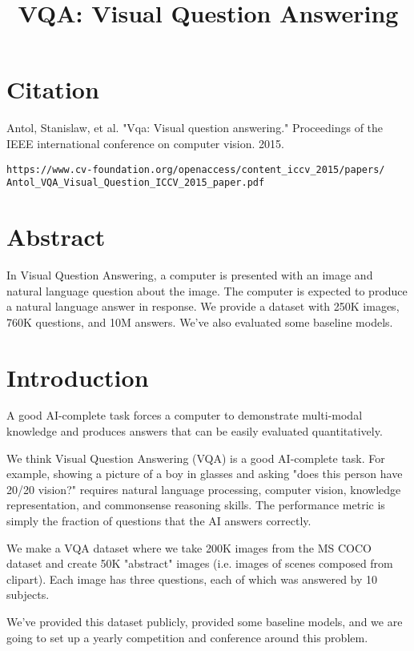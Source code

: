 \documentclass[a4paper]{article}
\title{VQA: Visual Question Answering}
\date{}
\begin{document}
\maketitle

\section{Citation}
Antol, Stanislaw, et al. "Vqa: Visual question answering." Proceedings of the IEEE international conference on computer vision. 2015.

\begin{verbatim}
https://www.cv-foundation.org/openaccess/content_iccv_2015/papers/
Antol_VQA_Visual_Question_ICCV_2015_paper.pdf
\end{verbatim}

\section{Abstract}
In Visual Question Answering, a computer is presented with an image and natural
language question about the image. The computer is expected to produce a
natural language answer in response. We provide a dataset with 250K images,
760K questions, and 10M answers. We've also evaluated some baseline models.

\section{Introduction}
A good AI-complete task forces a computer to demonstrate multi-modal knowledge
and produces answers that can be easily evaluated quantitatively.

We think Visual Question Answering (VQA) is a good AI-complete task. For
example, showing a picture of a boy in glasses and asking "does this person
have 20/20 vision?" requires natural language processing, computer vision,
knowledge representation, and commonsense reasoning skills. The performance
metric is simply the fraction of questions that the AI answers correctly.

We make a VQA dataset where we take 200K images from the MS COCO dataset and
create 50K "abstract" images (i.e. images of scenes composed from clipart).
Each image has three questions, each of which was answered by 10 subjects.

We've provided this dataset publicly, provided some baseline models, and
we are going to set up a yearly competition and conference around this
problem.
\end{document}
